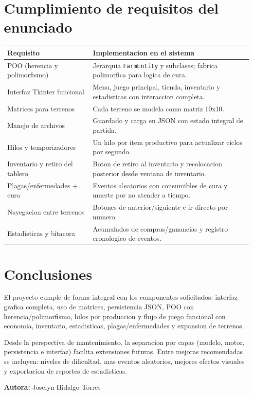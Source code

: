 \documentclass[12pt,a4paper]{article}
\begin{document}
\section{Cumplimiento de requisitos del enunciado}
\begin{longtable}{|p{}|p{}|}
\hline
\textbf{Requisito} & \textbf{Implementacion en el sistema} \\
\hline
POO (herencia y polimorfismo) & Jerarquia \texttt{FarmEntity} y subclases; fabrica polimorfica para logica de cura. \\
\hline
Interfaz Tkinter funcional & Menu, juego principal, tienda, inventario y estadisticas con interaccion completa. \\
\hline
Matrices para terrenos & Cada terreno se modela como matriz 10x10. \\
\hline
Manejo de archivos & Guardado y carga en JSON con estado integral de partida. \\
\hline
Hilos y temporizadores & Un hilo por item productivo para actualizar ciclos por segundo. \\
\hline
Inventario y retiro del tablero & Boton de retiro al inventario y recolocacion posterior desde ventana de inventario. \\
\hline
Plagas/enfermedades + cura & Eventos aleatorios con consumibles de cura y muerte por no atender a tiempo. \\
\hline
Navegacion entre terrenos & Botones de anterior/siguiente e ir directo por numero. \\
\hline
Estadisticas y bitacora & Acumulados de compras/ganancias y registro cronologico de eventos. \\
\hline
\end{longtable}

\section{Conclusiones}
El proyecto cumple de forma integral con los componentes solicitados: interfaz grafica completa, uso de matrices, persistencia JSON, POO con herencia/polimorfismo, hilos por produccion y flujo de juego funcional con economia, inventario, estadisticas, plagas/enfermedades y expansion de terrenos.

Desde la perspectiva de mantenimiento, la separacion por capas (modelo, motor, persistencia e interfaz) facilita extensiones futuras. Entre mejoras recomendadas se incluyen: niveles de dificultad, mas eventos aleatorios, mejores efectos visuales y exportacion de reportes de estadisticas.

\vspace{0.5cm}
\noindent\textbf{Autora:} Joselyn Hidalgo Torres
\end{document}
